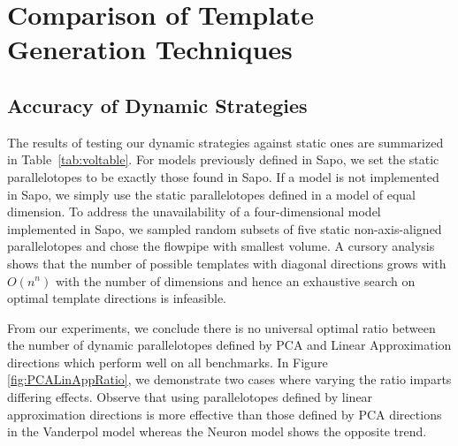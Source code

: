 \section{Comparison of Template Generation Techniques}
\label{sec:compare}

\subsection{Accuracy of Dynamic Strategies}
\label{sec:dynamic_accuracy}
The results of testing our dynamic strategies against static ones are summarized in Table~\ref{tab:voltable}. For models previously defined in Sapo, we set the static parallelotopes to be exactly those found in Sapo.
If a model is not implemented in Sapo, we simply use the static parallelotopes defined in a model of equal dimension. To address the unavailability of a four-dimensional model implemented in Sapo, we sampled random subsets of five static non-axis-aligned parallelotopes and chose the flowpipe with smallest volume.
%
%
A cursory analysis shows that the number of possible templates with diagonal directions grows with $O(n^n)$ with the number of dimensions and hence an exhaustive search on optimal template directions is infeasible.


From our experiments, we conclude there is no universal optimal ratio between the number of dynamic parallelotopes defined by PCA and Linear Approximation directions which perform well on all benchmarks. In Figure \ref{fig:PCALinAppRatio}, we demonstrate two cases where varying the ratio imparts differing effects. Observe that using parallelotopes defined by linear approximation directions is more effective than those defined by PCA directions in the Vanderpol model whereas the Neuron model shows the opposite trend.


